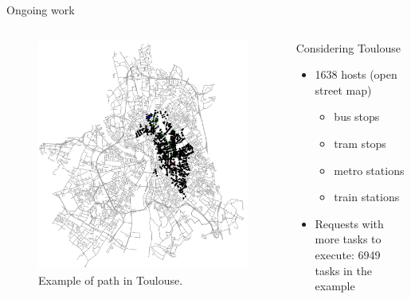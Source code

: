 \documentclass[Ligatures=TeX,table,svgnames,usetotalslideindicator,compress,10pt,aspectratio=169]{beamer}
\begin{document}
\begin{frame}{Ongoing work}

\begin{columns}

\begin{column}{0.5\textwidth}

   \begin{figure}[!h]
        \centering
        \includegraphics[width=.94\textwidth]{images/toulouse_path_alltasks.png}
        \caption{Example of path in Toulouse.}
      \end{figure}
      \end{column}
\begin{column}{0.5\textwidth}
Considering Toulouse
\begin{itemize}
    \item 1638 hosts (open street map)
    \begin{itemize}
        \item bus stops
        \item tram stops
        \item metro stations
        \item train stations
    \end{itemize}
    \item Requests with more tasks to execute: 6949 tasks in the example


\end{itemize}

\end{column}

\end{columns}

\end{frame}
\end{document}

